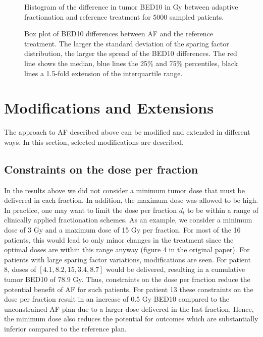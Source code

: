 \documentclass[11pt]{article}
\begin{document}
\begin{figure}[ht]
\centering
{}
\caption{Histogram of the difference in tumor BED10 in Gy between adaptive fractionation and reference treatment for 5000 sampled patients.}
\label{fig:sampled-patients}
\end{figure}

\begin{figure}[ht]
\centering
{}
\caption{Box plot of BED10 differences between AF and the reference treatment. The larger the standard deviation of the sparing factor distribution, the larger the spread of the BED10 differences. The red line shows the median, blue lines the 25\% and 75\% percentiles, black lines a 1.5-fold extension of the interquartile range.}
\label{fig:std-dependence}
\end{figure}

\section{Modifications and Extensions}

The approach to AF described above can be modified and extended in different ways. In this section, selected modifications are described.

\subsection{Constraints on the dose per fraction}

In the results above we did not consider a minimum tumor dose that must be delivered in each fraction. In addition, the maximum dose was allowed to be high. In practice, one may want to limit the dose per fraction $d_t$ to be within a range of clinically applied fractionation schemes. As an example, we consider a minimum dose of 3 Gy and a maximum dose of 15 Gy per fraction. For most of the 16 patients, this would lead to only minor changes in the treatment since the optimal doses are within this range anyway (figure 4 in the original paper). For patients with large sparing factor variations, modifications are seen. For patient 8, doses of $[4.1, 8.2, 15, 3.4, 8.7]$ would be delivered, resulting in a cumulative tumor BED10 of 78.9 Gy. Thus, constraints on the dose per fraction reduce the potential benefit of AF for such patients. For patient 13 these constraints on the dose per fraction result in an increase of 0.5 Gy BED10 compared to the unconstrained AF plan due to a larger dose delivered in the last fraction. Hence, the minimum dose also reduces the potential for outcomes which are substantially inferior compared to the reference plan.
\end{document}
